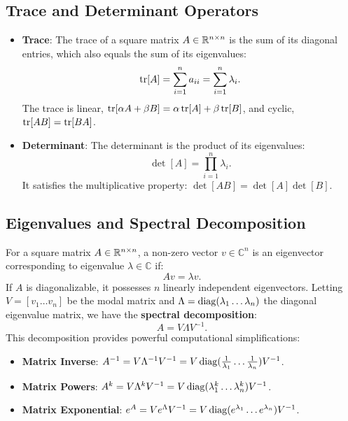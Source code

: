 \subsection{Trace and Determinant Operators}
\begin{itemize}
    \item \textbf{Trace}: The trace of a square matrix $A \in \mathbb{R}^{n \times n}$ is the sum of its diagonal entries, which also equals the sum of its eigenvalues:
    \begin{equation}
\operatorname{tr}[A] = \sum_{i=1}^n a_{ii} = \sum_{i=1}^n \lambda_i .
    \end{equation}
    The trace is linear, $\operatorname{tr}[\alpha A + \beta B] = \alpha\operatorname{tr}[A] + \beta\operatorname{tr}[B]$, and cyclic, $\operatorname{tr}[AB] = \operatorname{tr}[BA]$.
    \item \textbf{Determinant}: The determinant is the product of its eigenvalues:
    \begin{equation}
\det[A] = \prod_{i=1}^n \lambda_i .
    \end{equation}
    It satisfies the multiplicative property: $\det[AB] = \det[A]\det[B]$.
\end{itemize}

\subsection{Eigenvalues and Spectral Decomposition}
For a square matrix $A \in \mathbb{R}^{n \times n}$, a non-zero vector $v \in \mathbb{C}^n$ is an eigenvector corresponding to eigenvalue $\lambda \in \mathbb{C}$ if:
\begin{equation}
A v = \lambda v .
\end{equation}
If $A$ is diagonalizable, it possesses $n$ linearly independent eigenvectors. Letting $V = [v_1 \dots v_n]$ be the modal matrix and $\Lambda = \operatorname{diag}(\lambda_1 \dots \lambda_n)$ the diagonal eigenvalue matrix, we have the \textbf{spectral decomposition}:
\begin{equation}
A = V \Lambda V^{-1} .
\end{equation}
This decomposition provides powerful computational simplifications:
\begin{itemize}
    \item \textbf{Matrix Inverse}: $A^{-1} = V \Lambda^{-1} V^{-1} = V \operatorname{diag}(\frac{1}{\lambda_1} \dots \frac{1}{\lambda_n}) V^{-1}$.
    \item \textbf{Matrix Powers}: $A^k = V \Lambda^k V^{-1} = V \operatorname{diag}(\lambda_1^k \dots \lambda_n^k) V^{-1}$.
    \item \textbf{Matrix Exponential}: $e^A = V e^\Lambda V^{-1} = V \operatorname{diag}(e^{\lambda_1} \dots e^{\lambda_n}) V^{-1}$.
\end{itemize}

